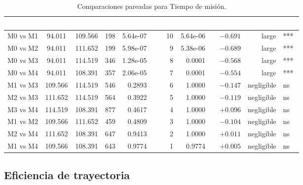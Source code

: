 \documentclass[12pt,a4paper,oneside]{book}
\begin{document}
\begin{table}[H]
\centering
\small
\caption{Comparaciones pareadas para Tiempo de misión.}
\renewcommand{\arraystretch}{1.15}
\begin{tabular}{lcccrrrrrl}
\toprule
\rowcolor{primary}
\textcolor{white}{\textbf{Comp.}} & \textcolor{white}{\textbf{med A}} & \textcolor{white}{\textbf{med B}} & \textcolor{white}{\textbf{$U$}} & \textcolor{white}{\textbf{$p$ raw}} & \textcolor{white}{\textbf{Mult.}} & \textcolor{white}{\textbf{$p$ Holm}} & \textcolor{white}{\textbf{$\delta(A,B)$}} & \textcolor{white}{\textbf{Mag.}} & \textcolor{white}{\textbf{Sig.}} \\
\midrule
M0 vs M1 & 94.011 & 109.566 & 198 & 5.64e-07 & 10 & 5.64e-06 & $-0.691$ & large & *** \\
M0 vs M2 & 94.011 & 111.652 & 199 & 5.98e-07 & 9 & 5.38e-06 & $-0.689$ & large & *** \\
M0 vs M3 & 94.011 & 114.519 & 346 & 1.28e-05 & 8 & 0.0001 & $-0.568$ & large & *** \\
M0 vs M4 & 94.011 & 108.391 & 357 & 2.06e-05 & 7 & 0.0001 & $-0.554$ & large & *** \\
M1 vs M3 & 109.566 & 114.519 & 546 & 0.2893 & 6 & 1.0000 & $-0.147$ & negligible & ns \\
M2 vs M3 & 111.652 & 114.519 & 564 & 0.3922 & 5 & 1.0000 & $-0.119$ & negligible & ns \\
M3 vs M4 & 114.519 & 108.391 & 877 & 0.4617 & 4 & 1.0000 & $+0.096$ & negligible & ns \\
M1 vs M2 & 109.566 & 111.652 & 459 & 0.4809 & 3 & 1.0000 & $-0.104$ & negligible & ns \\
M2 vs M4 & 111.652 & 108.391 & 647 & 0.9413 & 2 & 1.0000 & $+0.011$ & negligible & ns \\
M1 vs M4 & 109.566 & 108.391 & 643 & 0.9774 & 1 & 0.9774 & $+0.005$ & negligible & ns \\
\bottomrule
\end{tabular}
\end{table}

\subsection{Eficiencia de trayectoria}
\end{document}
